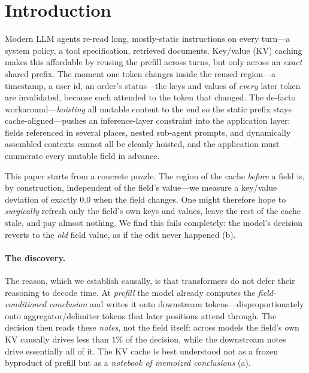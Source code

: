 \section{Introduction}
\label{sec:intro}

Modern LLM agents re-read long, mostly-static instructions on every turn---a system policy, a tool
specification, retrieved documents. Key/value (KV) caching makes this affordable by reusing the prefill
across turns, but only across an \emph{exact} shared prefix. The moment one token changes inside the reused
region---a timestamp, a user id, an order's status---the keys and values of \emph{every} later token are
invalidated, because each attended to the token that changed. The de-facto workaround---\emph{hoisting} all
mutable content to the end so the static prefix stays cache-aligned---pushes an inference-layer constraint
into the application layer: fields referenced in several places, nested sub-agent prompts, and dynamically
assembled contexts cannot all be cleanly hoisted, and the application must enumerate every mutable field in
advance.

This paper starts from a concrete puzzle. The region of the cache \emph{before} a field is, by
construction, independent of the field's value---we measure a key/value deviation of exactly $0.0$ when
the field changes. One might therefore hope to \emph{surgically} refresh only the field's own keys and
values, leave the rest of the cache stale, and pay almost nothing. We find this fails completely: the
model's decision reverts to the \emph{old} field value, as if the edit never happened
(b).

\paragraph{The discovery.} The reason, which we establish causally, is that transformers do not defer
their reasoning to decode time. At \emph{prefill} the model already computes the
\emph{field-conditioned conclusion} and writes it onto downstream tokens---disproportionately onto
aggregator/delimiter tokens that later positions attend through. The decision then reads these
\emph{notes}, not the field itself: across models the field's own KV causally drives less than $1\%$ of
the decision, while the downstream notes drive essentially all of it. The KV cache is best understood not
as a frozen byproduct of prefill but as a \emph{notebook of memoized conclusions} (a).


